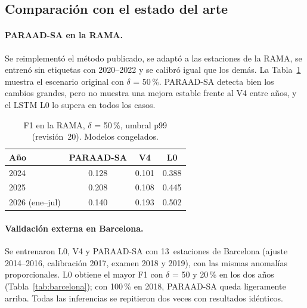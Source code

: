 \documentclass[11pt, letterpaper]{article}
\begin{document}
\subsection{Comparación con el estado del arte}
\label{sec:sota}

\paragraph{PARAAD-SA en la RAMA.} Se reimplementó el método publicado, se adaptó a las
estaciones de la RAMA, se entrenó sin etiquetas con 2020--2022 y se calibró igual que los
demás. La Tabla~\ref{tab:paraad} muestra el escenario original con $\delta$ = 50\,\%.
PARAAD-SA detecta bien los cambios grandes, pero no muestra una mejora estable frente al
V4 entre años, y el LSTM L0 lo supera en todos los casos.

\begin{table}[H]
  \centering
  \small
  \caption{F1 en la RAMA, $\delta$ = 50\,\%, umbral p99 (revisión~20). Modelos congelados.}
  \label{tab:paraad}
  \begin{tabular}{@{}lccc@{}}
    \toprule
    \textbf{Año} & \textbf{PARAAD-SA} & \textbf{V4} & \textbf{L0} \\
    \midrule
    2024 & 0.128 & 0.101 & 0.388 \\
    2025 & 0.208 & 0.108 & 0.445 \\
    2026 (ene--jul) & 0.140 & 0.193 & 0.502 \\
    \bottomrule
  \end{tabular}
\end{table}

\paragraph{Validación externa en Barcelona.} Se entrenaron L0, V4 y PARAAD-SA con
13~estaciones de Barcelona (ajuste 2014--2016, calibración 2017, examen 2018 y 2019), con
las mismas anomalías proporcionales. L0 obtiene el mayor F1 con $\delta$ = 50 y 20\,\%
en los dos años (Tabla~\ref{tab:barcelona}); con 100\,\% en 2018, PARAAD-SA queda
ligeramente arriba. Todas las inferencias se repitieron dos veces con resultados
idénticos.
\end{document}
